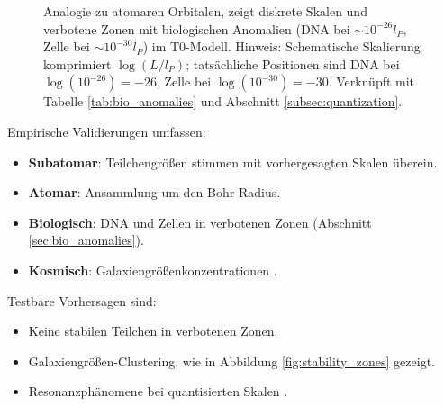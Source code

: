 \documentclass[12pt,a4paper]{article}
\begin{document}
	\begin{figure}[htbp]
		\centering
		\caption{Analogie zu atomaren Orbitalen, zeigt diskrete Skalen und verbotene Zonen mit biologischen Anomalien (DNA bei \(\sim 10^{-26} l_P\), Zelle bei \(\sim 10^{-30} l_P\)) im T0-Modell. Hinweis: Schematische Skalierung komprimiert \(\log(L/l_P)\); tatsächliche Positionen sind DNA bei \(\log(10^{-26}) = -26\), Zelle bei \(\log(10^{-30}) = -30\). Verknüpft mit Tabelle \ref{tab:bio_anomalies} und Abschnitt \ref{subsec:quantization}.}
		\label{fig:orbital_analogy}
	\end{figure}
	
	Empirische Validierungen umfassen:
	\begin{itemize}
		\item \textbf{Subatomar}: Teilchengrößen stimmen mit vorhergesagten Skalen überein.
		\item \textbf{Atomar}: Ansammlung um den Bohr-Radius.
		\item \textbf{Biologisch}: DNA und Zellen in verbotenen Zonen (Abschnitt \ref{sec:bio_anomalies}).
		\item \textbf{Kosmisch}: Galaxiengrößenkonzentrationen \cite{pascher_galaxies_2025}.
	\end{itemize}
	
	Testbare Vorhersagen sind:
	\begin{itemize}
		\item Keine stabilen Teilchen in verbotenen Zonen.
		\item Galaxiengrößen-Clustering, wie in Abbildung \ref{fig:stability_zones} gezeigt.
		\item Resonanzphänomene bei quantisierten Skalen \cite{pascher_quantum_2025}.
	\end{itemize}
	
\end{document}
